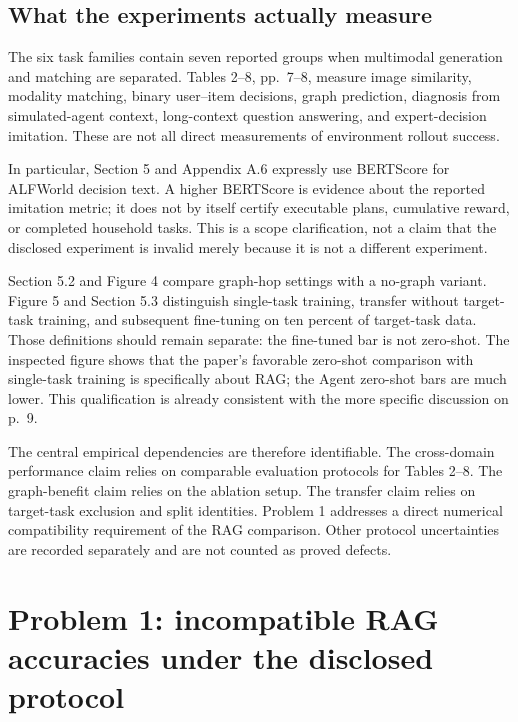 \documentclass[10pt]{article}
\begin{document}
\subsection*{What the experiments actually measure}
The six task families contain seven reported groups when multimodal generation and matching are separated. Tables 2–8, pp. 7–8, measure image similarity, modality matching, binary user–item decisions, graph prediction, diagnosis from simulated-agent context, long-context question answering, and expert-decision imitation. These are not all direct measurements of environment rollout success.\par
In particular, Section 5 and Appendix A.6 expressly use BERTScore for ALFWorld decision text. A higher BERTScore is evidence about the reported imitation metric; it does not by itself certify executable plans, cumulative reward, or completed household tasks. This is a scope clarification, not a claim that the disclosed experiment is invalid merely because it is not a different experiment.\par
Section 5.2 and Figure 4 compare graph-hop settings with a no-graph variant. Figure 5 and Section 5.3 distinguish single-task training, transfer without target-task training, and subsequent fine-tuning on ten percent of target-task data. Those definitions should remain separate: the fine-tuned bar is not zero-shot. The inspected figure shows that the paper’s favorable zero-shot comparison with single-task training is specifically about RAG; the Agent zero-shot bars are much lower. This qualification is already consistent with the more specific discussion on p. 9.\par
The central empirical dependencies are therefore identifiable. The cross-domain performance claim relies on comparable evaluation protocols for Tables 2–8. The graph-benefit claim relies on the ablation setup. The transfer claim relies on target-task exclusion and split identities. Problem 1 addresses a direct numerical compatibility requirement of the RAG comparison. Other protocol uncertainties are recorded separately and are not counted as proved defects.\par
\section*{Problem 1: incompatible RAG accuracies under the disclosed protocol}
\end{document}
